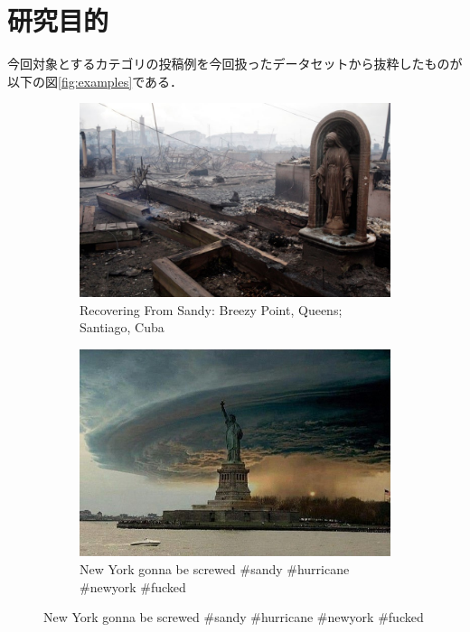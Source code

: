 \chapter{研究目的}
%
今回対象とするカテゴリの投稿例を今回扱ったデータセットから抜粋したものが以下の図\ref{fig:examples}である．

\begin{figure}[ht]
    \centering
    \begin{subfigure}[b]{0.3\textwidth}
        \includegraphics[width=\linewidth]{images/real_example.jpg}
        \caption{Recovering From Sandy: Breezy Point, Queens; Santiago, Cuba}
        \label{fig:real}
    \end{subfigure}
    \hfill %
    \begin{subfigure}[b]{0.3\textwidth}
        \includegraphics[width=\linewidth]{images/fake_example.jpg}
        \caption{New York gonna be screwed \#sandy \#hurricane \#newyork \#fucked}

\end{subfigure}
\end{figure}
